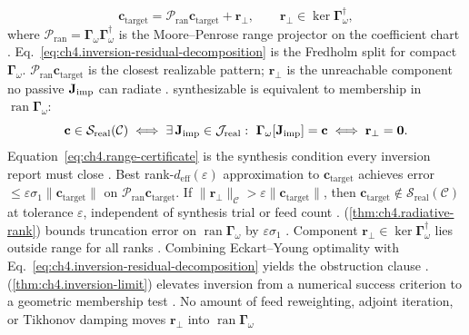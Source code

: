 \begin{equation}
\label{eq:ch4.inversion-residual-decomposition}
\mathbf{c}_{\mathrm{target}}=\mathcal{P}_{\mathrm{ran}}\mathbf{c}_{\mathrm{target}}+\mathbf{r}_{\perp},\qquad
\mathbf{r}_{\perp}\in\ker\boldsymbol{\Gamma}_\omega^{\dagger},
\end{equation}
where \(\mathcal{P}_{\mathrm{ran}}=\boldsymbol{\Gamma}_\omega\boldsymbol{\Gamma}_\omega^{\dagger}\) is the Moore--Penrose range projector on the
coefficient chart \cite{harrington2001}. Eq.~\eqref{eq:ch4.inversion-residual-decomposition} is the Fredholm split for
compact \(\boldsymbol{\Gamma}_\omega\). \(\mathcal{P}_{\mathrm{ran}}\mathbf{c}_{\mathrm{target}}\) is the closest realizable pattern;
\(\mathbf{r}_{\perp}\) is the unreachable component no passive \(\mathbf{J}_{\mathrm{imp}}\) can radiate \cite{devaney2004}.
synthesizable is equivalent to membership in \(\operatorname{ran}\boldsymbol{\Gamma}_\omega\):
\begin{equation}
\label{eq:ch4.range-certificate}
\mathbf{c}\in\mathcal{S}_{\mathrm{real}}(\mathcal{C})
\iff
\exists\,\Jimp\in\mathcal{J}_{\mathrm{real}}:\ \boldsymbol{\Gamma}_\omega[\Jimp]=\mathbf{c}
\iff
\mathbf{r}_{\perp}=\mathbf{0}.
\end{equation}
Equation~\eqref{eq:ch4.range-certificate} is the synthesis condition every inversion report must close \cite{stratton1941}.
\label{thm:ch4.inversion-limit}
Best rank-\(d_{\mathrm{eff}}(\varepsilon)\) approximation to \(\mathbf{c}_{\mathrm{target}}\) achieves error
\(\le\varepsilon\sigma_{1}\|\mathbf{c}_{\mathrm{target}}\|\) on \(\mathcal{P}_{\mathrm{ran}}\mathbf{c}_{\mathrm{target}}\). If
\(\|\mathbf{r}_{\perp}\|_{\mathcal{C}}>\varepsilon\|\mathbf{c}_{\mathrm{target}}\|\), then
\(\mathbf{c}_{\mathrm{target}}\notin\mathcal{S}_{\mathrm{real}}(\mathcal{C})\) at tolerance \(\varepsilon\), independent of synthesis trial or feed count
\cite{stratton1941}.
(\ref{thm:ch4.radiative-rank}) bounds truncation error on \(\operatorname{ran}\boldsymbol{\Gamma}_\omega\) by \(\varepsilon\sigma_{1}\)
\cite{harrington2001}. Component \(\mathbf{r}_{\perp}\in\ker\boldsymbol{\Gamma}_\omega^{\dagger}\) lies outside range for all ranks
\cite{devaney2004}. Combining Eckart--Young optimality with Eq.~\eqref{eq:ch4.inversion-residual-decomposition} yields the obstruction clause
\cite{hansen1988}.
(\ref{thm:ch4.inversion-limit}) elevates inversion from a numerical success criterion to a geometric membership test \cite{stratton1941}. No
amount of feed reweighting, adjoint iteration, or Tikhonov damping moves \(\mathbf{r}_{\perp}\) into \(\operatorname{ran}\boldsymbol{\Gamma}_\omega\)
